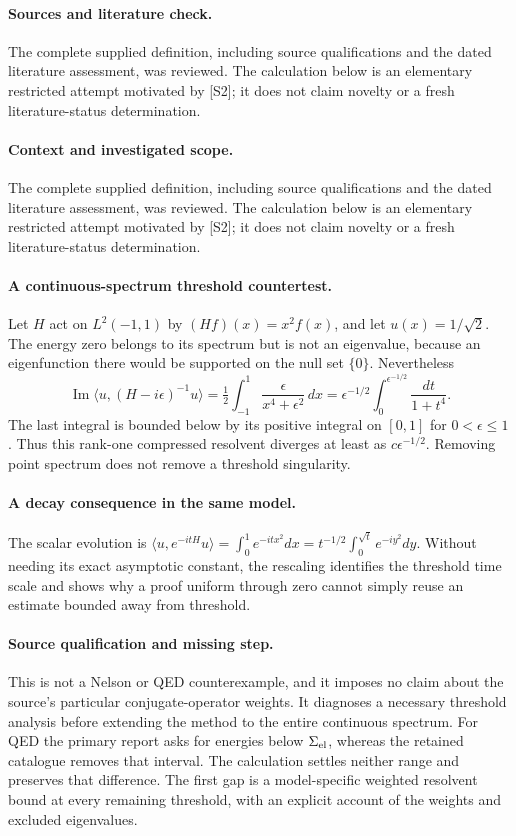\documentclass[11pt]{article}
\begin{document}
\paragraph{Sources and literature check.}
The complete supplied definition, including source qualifications and the dated literature assessment, was reviewed. The calculation below is an elementary restricted attempt motivated by [S2]; it does not claim novelty or a fresh literature-status determination.

\paragraph{Context and investigated scope.} The complete supplied definition, including source qualifications and the dated literature assessment, was reviewed. The calculation below is an elementary restricted attempt motivated by [S2]; it does not claim novelty or a fresh literature-status determination.

\paragraph{A continuous-spectrum threshold countertest.} Let $H$ act on $L^2(-1,1)$ by $(Hf)(x)=x^2f(x)$, and let $u(x)=1/\sqrt2$. The energy zero belongs to its spectrum but is not an eigenvalue, because an eigenfunction there would be supported on the null set $\{0\}$. Nevertheless
\[
 \operatorname{Im}\langle u,(H-i\epsilon)^{-1}u\rangle
 =\tfrac12\int_{-1}^1\frac{\epsilon}{x^4+\epsilon^2}\,dx
 =\epsilon^{-1/2}\int_0^{\epsilon^{-1/2}}\frac{dt}{1+t^4}.
\]
The last integral is bounded below by its positive integral on $[0,1]$ for $0<\epsilon\leq1$. Thus this rank-one compressed resolvent diverges at least as $c\epsilon^{-1/2}$. Removing point spectrum does not remove a threshold singularity.

\paragraph{A decay consequence in the same model.} The scalar evolution is $\langle u,e^{-itH}u\rangle=\int_0^1e^{-itx^2}dx=t^{-1/2}\int_0^{\sqrt t}e^{-iy^2}dy$. Without needing its exact asymptotic constant, the rescaling identifies the threshold time scale and shows why a proof uniform through zero cannot simply reuse an estimate bounded away from threshold.

\paragraph{Source qualification and missing step.} This is not a Nelson or QED counterexample, and it imposes no claim about the source's particular conjugate-operator weights. It diagnoses a necessary threshold analysis before extending the method to the entire continuous spectrum. For QED the primary report asks for energies below $\Sigma_{\rm el}$, whereas the retained catalogue removes that interval. The calculation settles neither range and preserves that difference. The first gap is a model-specific weighted resolvent bound at every remaining threshold, with an explicit account of the weights and excluded eigenvalues.
\end{document}
